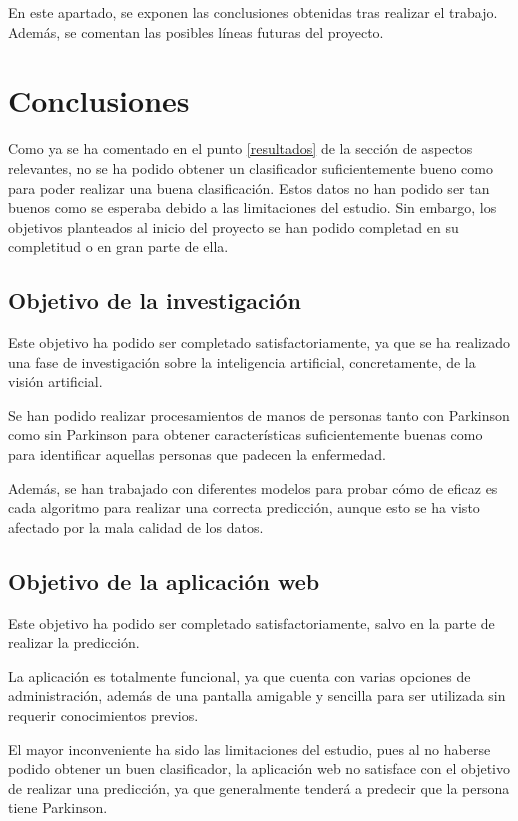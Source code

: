 En este apartado, se exponen las conclusiones obtenidas tras realizar el trabajo. Además, se comentan las posibles líneas futuras del proyecto.
 
 \section{Conclusiones}
 Como ya se ha comentado en el punto \ref{resultados} de la sección de aspectos relevantes, no se ha podido obtener un clasificador suficientemente bueno como para poder realizar una buena clasificación. Estos datos no han podido ser tan buenos como se esperaba debido a las limitaciones del estudio. Sin embargo, los objetivos planteados al inicio del proyecto se han podido completad en su completitud o en gran parte de ella.
 
 \subsection{Objetivo de la investigación}
 Este objetivo ha podido ser completado satisfactoriamente, ya que se ha realizado una fase de investigación sobre la inteligencia artificial, concretamente, de la visión artificial.
 
 Se han podido realizar procesamientos de manos de personas tanto con Parkinson como sin Parkinson para obtener características suficientemente buenas como para identificar aquellas personas que padecen la enfermedad.
 
 Además, se han trabajado con diferentes modelos para probar cómo de eficaz es cada algoritmo para realizar una correcta predicción, aunque esto se ha visto afectado por la mala calidad de los datos.
 
 \subsection{Objetivo de la aplicación web}
 Este objetivo ha podido ser completado satisfactoriamente, salvo en la parte de realizar la predicción.
 
 La aplicación es totalmente funcional, ya que cuenta con varias opciones de administración, además de una pantalla amigable y sencilla para ser utilizada sin requerir conocimientos previos.
 
 El mayor inconveniente ha sido las limitaciones del estudio, pues al no haberse podido obtener un buen clasificador, la aplicación web no satisface con el objetivo de realizar una predicción, ya que generalmente tenderá a predecir que la persona tiene Parkinson.
 
